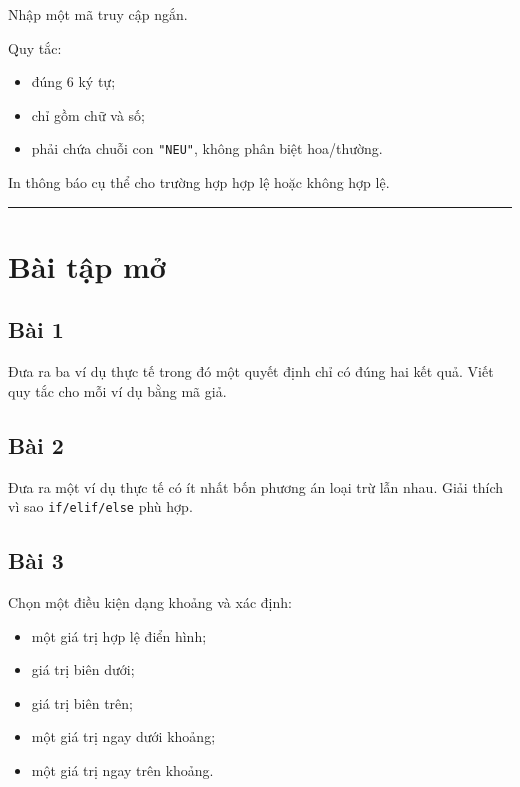 \documentclass[
  11pt,
  a4paper,
]{article}
\providecommand{\tightlist}{%
  \setlength{\itemsep}{0pt}\setlength{\parskip}{0pt}}
\begin{document}
Nhập một mã truy cập ngắn.

Quy tắc:

\begin{itemize}
\tightlist
\item
  đúng 6 ký tự;
\item
  chỉ gồm chữ và số;
\item
  phải chứa chuỗi con \texttt{"NEU"}, không phân biệt hoa/thường.
\end{itemize}

In thông báo cụ thể cho trường hợp hợp lệ hoặc không hợp lệ.

\begin{center}\rule{0.5\linewidth}{0.5pt}\end{center}

\section{Bài tập mở}\label{buxe0i-tux1eadp-mux1edf}

\subsection{Bài 1}\label{buxe0i-1}

Đưa ra ba ví dụ thực tế trong đó một quyết định chỉ có đúng hai kết quả.
Viết quy tắc cho mỗi ví dụ bằng mã giả.

\subsection{Bài 2}\label{buxe0i-2}

Đưa ra một ví dụ thực tế có ít nhất bốn phương án loại trừ lẫn nhau.
Giải thích vì sao \texttt{if/elif/else} phù hợp.

\subsection{Bài 3}\label{buxe0i-3}

Chọn một điều kiện dạng khoảng và xác định:

\begin{itemize}
\tightlist
\item
  một giá trị hợp lệ điển hình;
\item
  giá trị biên dưới;
\item
  giá trị biên trên;
\item
  một giá trị ngay dưới khoảng;
\item
  một giá trị ngay trên khoảng.
\end{itemize}
\end{document}
